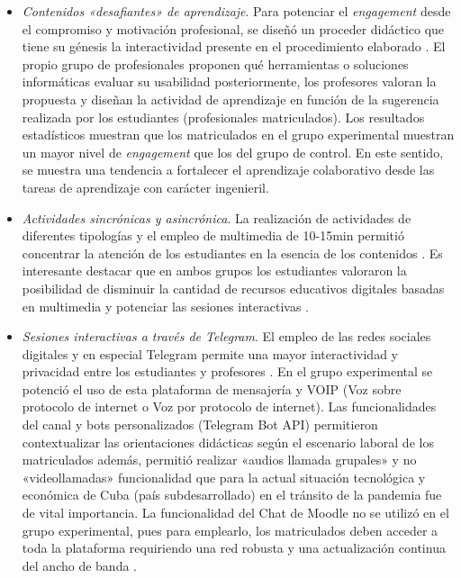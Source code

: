 \documentclass{textolivre}
\begin{document}
\begin{itemize}
    \item \emph{Contenidos «desafiantes» de aprendizaje}. Para potenciar el \emph{engagement} desde el compromiso y motivación profesional, se diseñó un proceder didáctico que tiene su génesis la interactividad presente en el procedimiento elaborado . El propio grupo de profesionales proponen qué herramientas o soluciones informáticas evaluar su usabilidad  posteriormente, los profesores valoran la propuesta y diseñan la actividad de aprendizaje en función de la sugerencia realizada por los estudiantes (profesionales matriculados). Los resultados estadísticos muestran que los matriculados en el grupo experimental muestran un mayor nivel de \emph{engagement} que los del grupo de control. En este sentido, se muestra una tendencia a fortalecer el aprendizaje colaborativo \cite{cavinato2021} %
    desde las tareas de aprendizaje con carácter ingenieril.

    \item \emph{Actividades sincrónicas y asincrónica}.  La realización de actividades de diferentes tipologías y el empleo de multimedia de 10-15min permitió concentrar la atención de los estudiantes en la esencia de los contenidos \cite{cavinato2021}. %
    Es interesante destacar que en ambos grupos los estudiantes valoraron la posibilidad de disminuir la cantidad de recursos educativos digitales basadas en multimedia y potenciar las sesiones interactivas \cite{alexander2018, kerimbayev2020, snyder2020, sim2021, walker2021, smith2021}. %
    
    \item \emph{Sesiones interactivas a través de Telegram}. El empleo de las redes sociales digitales y en especial Telegram permite una mayor interactividad y privacidad entre los estudiantes y profesores \cite{gazcaherrera2020, paredes2020, fuentescancell2021}. %
    En el grupo experimental se potenció el uso de esta plataforma de mensajería y VOIP (Voz sobre protocolo de internet o Voz por protocolo de internet). Las funcionalidades del canal y bots personalizados (Telegram Bot API) permitieron contextualizar las orientaciones didácticas según el escenario laboral de los matriculados además, permitió realizar «audios llamada grupales» y no «videollamadas» funcionalidad que para la actual situación tecnológica y económica de Cuba (país subdesarrollado) en el tránsito de la pandemia fue de vital importancia. La funcionalidad del Chat de Moodle no se utilizó en el grupo experimental, pues para emplearlo, los matriculados deben acceder a toda la plataforma requiriendo una red robusta y una actualización continua del ancho de banda \cite {maphosa2020}. %
\end{itemize} 
\end{document}
